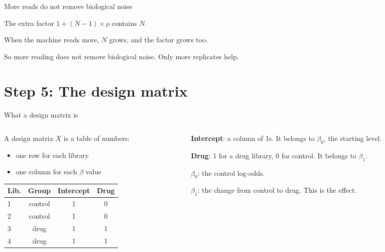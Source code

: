 \documentclass[aspectratio=169,11pt]{beamer}
\begin{document}
\begin{frame}{More reads do not remove biological noise}
\begin{remember}
The extra factor $1 + (N-1) \times \rho$ contains $N$.

When the machine reads more, $N$ grows, and the factor grows too.

So more reading does not remove biological noise. Only \alert{more
replicates} help.
\end{remember}
\end{frame}

\section{Step 5: The design matrix}

\begin{frame}{What a design matrix is}
\begin{columns}[T]
\begin{column}{0.5\textwidth}
A \alert{design matrix} $X$ is a table of numbers:
\begin{itemize}
\item one \alert{row} for each library
\item one \alert{column} for each $\beta$ value
\end{itemize}
\medskip
\centering
\begin{tabular}{lc|cc}
\toprule
Lib. & Group & Intercept & Drug\\
\midrule
1 & control & 1 & 0\\
2 & control & 1 & 0\\
3 & drug    & 1 & 1\\
4 & drug    & 1 & 1\\
\bottomrule
\end{tabular}
\end{column}
\begin{column}{0.46\textwidth}
\begin{symbols}
\small
\textbf{Intercept}: a column of 1s. It belongs to $\beta_0$, the starting
level.

\textbf{Drug}: 1 for a drug library, 0 for control. It belongs to
$\beta_1$.

$\beta_0$: the control log-odds.

$\beta_1$: the change from control to drug. This is the \alert{effect}.
\end{symbols}
\end{column}
\end{columns}
\end{frame}
\end{document}
